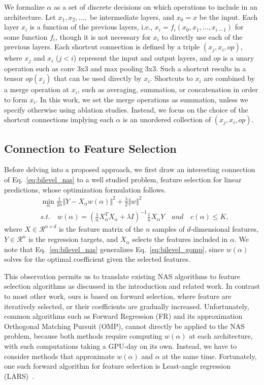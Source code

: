 We formalize $\alpha$ as a set of discrete decisions on which operations to include in an architecture.
Let $x_1, x_2,...,$ be intermediate layers, and $x_0 = x$ be the input. Each layer $x_i$ is a function
of the previous layers, i.e., $x_{i} = f_i ( x_0, x_1,..., x_{i-1})$ for some function $f_i$, 
though it is not necessary for $x_i$ to directly use each of the previous layers.
Each shortcut connection is defined by a triple $(x_{j}, x_{i}, op)$, 
where $x_j$ and $x_i$ ($j < i$) represent the input and output layers, and $op$ is a unary operation such 
as conv 3x3 and max pooling 3x3. Such a shortcut results in a tensor $op(x_{j})$ that can be used directly by 
$x_i$. Shortcuts to $x_i$ are combined by a merge operation 
at $x_i$, such as averaging, summation, or concatenation in order to form $x_i$.
In this work, we set the merge operations as summation, unless we specify otherwise using ablation studies. Instead, we focus on the choice of the shortcut connections implying each $\alpha$ is an unordered collection of $(x_j, x_i, op)$.  

\subsection{Connection to Feature Selection}

Before delving into a proposed approach, we first draw an interesting connection of Eq.~\ref{eq:bilevel_nas}
to a well studied problem, feature selection for linear predictions, whose optimization formulation follows.
\begin{align}
&\min _{\alpha} \frac{1}{2n} \Vert Y - X_{\alpha} w(\alpha) \Vert ^2 + \frac{\lambda}{2} \Vert w \Vert ^2 \\
&s.t. \quad w(\alpha) = (\frac{1}{n}X_{\alpha}^TX_{\alpha} + \lambda I)^{-1} \frac{1}{n} X_{\alpha}Y 
\quad and \quad c(\alpha) \leq K,
\label{eq:bilevel_gomp}
\end{align}
where $X \in \mathcal{R}^{n \times d}$ is the feature matrix of the $n$ samples of $d$-dimensional features,
$Y \in \mathcal{R}^n$ is the regression targets, and $X_{\alpha}$ selects the features included in $\alpha$.
We note that Eq.~\ref{eq:bilevel_nas} generalizes Eq.~\ref{eq:bilevel_gomp}, since $w(\alpha)$ solves for the 
optimal coefficient given the selected features.

This observation permits us to translate existing NAS algorithms to
feature selection algorithms as discussed in the introduction and
related work.  In contrast to most other work, ours is based on
forward selection, where feature are iteratively selected, or their
coefficients are gradually increased.  Unfortunately, common
algorithms such as Forward Regression (FR) and its approximation
Orthogonal Matching Pursuit (OMP), cannot directly be applied to the
NAS problem, because both methods require computing $w(\alpha)$ at
each architecture, with such computations taking a GPU-day on its
own. Instead, we have to consider methods that approximate $w(\alpha)$
and $\alpha$ at the same time. Fortunately, one such forward algorithm
for feature selection is Least-angle regression (LARS)~\citep{lars}.

